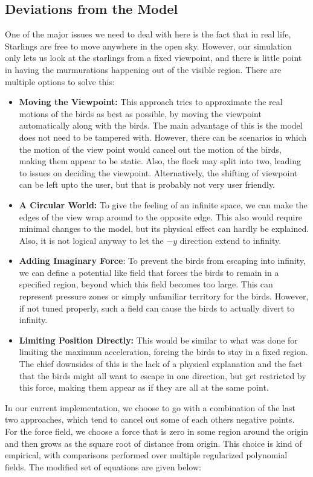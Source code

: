 \documentclass{article}
\begin{document}
\subsection{Deviations from the Model}
One of the major issues we need to deal with here is the fact that in real life, Starlings are free to move anywhere in the open sky. However, our simulation only lets us look at the starlings from a fixed viewpoint, and there is little point in having the murmurations happening out of the visible region. There are multiple options to solve this:
\begin{itemize}
    \item \textbf{Moving the Viewpoint:} This approach tries to approximate the real motions of the birds as best as possible, by moving the viewpoint automatically along with the birds. The main advantage of this is the model does not need to be tampered with. However, there can be scenarios in which the motion of the view point would cancel out the motion of the birds, making them appear to be static. Also, the flock may split into two, leading to issues on deciding the viewpoint. Alternatively, the shifting of viewpoint can be left upto the user, but that is probably not very user friendly.
    \item \textbf{A Circular World:} To give the feeling of an infinite space, we can make the edges of the view wrap around to the opposite edge. This also would require minimal changes to the model, but its physical effect can hardly be explained. Also, it is not logical anyway to let the $-y$ direction extend to infinity.
    \item \textbf{Adding Imaginary Force}: To prevent the birds from escaping into infinity, we can define a potential like field that forces the birds to remain in a specified region, beyond which this field becomes too large. This can represent pressure zones or simply unfamiliar territory for the birds. However, if not tuned properly, such a field can cause the birds to actually divert to infinity.
    \item \textbf{Limiting Position Directly:} This would be similar to what was done for limiting the maximum acceleration, forcing the birds to stay in a fixed region. The chief downsides of this is the lack of a physical explanation and the fact that the birds might all want to escape in one direction, but get restricted by this force, making them appear as if they are all at the same point.
\end{itemize}
In our current implementation, we choose to go with a combination of the last two approaches, which tend to cancel out some of each others negative points. For the force field, we choose a force that is zero in some region around the origin and then grows as the square root of distance from origin. This choice is kind of empirical, with comparisons performed over multiple regularized polynomial fields. The modified set of equations are given below:
\end{document}
